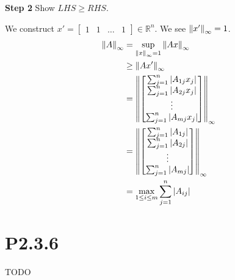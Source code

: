 \documentclass{article}
\begin{document}
\textbf{Step 2} Show $LHS \ge RHS$.

We construct $x'=\begin{bmatrix}
        1 & 1 & \dots & 1
    \end{bmatrix} \in \mathbb{R}^n$. We see $\norm{x'}_\infty=1$.
\begin{align*}
    \norm{A}_\infty
     & = \sup_{\norm{x}_\infty=1}
    \norm{Ax}_\infty              \\
     & \ge \norm{Ax'}_\infty      \\
     & = \norm{
        \begin{bmatrix}
            \sum_{j=1}^n |A_{1j}x_j| \\
            \sum_{j=1}^n |A_{2j}x_j| \\
            \vdots                   \\
            \sum_{j=1}^n |A_{mj}x_j|
        \end{bmatrix}
    }_\infty                      \\
     & = \norm{
        \begin{bmatrix}
            \sum_{j=1}^n |A_{1j}| \\
            \sum_{j=1}^n |A_{2j}| \\
            \vdots                \\
            \sum_{j=1}^n |A_{mj}|
        \end{bmatrix}
    }_\infty                      \\
     & = \max_{1 \le i \le m}
    \sum_{j=1}^n |A_{ij}|
\end{align*}

\section*{P2.3.6}
TODO
\end{document}
